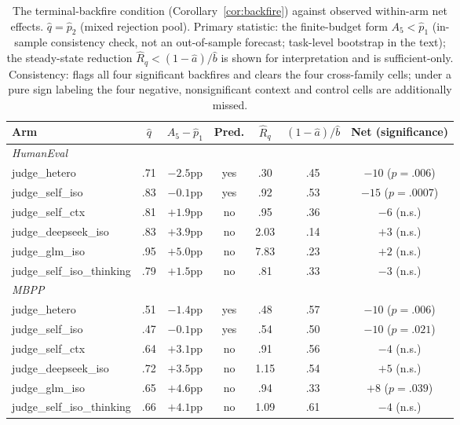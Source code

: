 \documentclass[10pt]{article}
\begin{document}
\begin{table}[t]
\centering\small
\caption{The terminal-backfire condition
(Corollary~\ref{cor:backfire}) against observed within-arm net
effects.  $\hat q = \hat p_2$ (mixed rejection pool).  Primary
statistic: the finite-budget form $A_5 < \hat p_1$ (in-sample
consistency check, not an out-of-sample forecast; task-level
bootstrap in the text); the steady-state reduction
$\hat R_q < (1-\hat a)/\hat b$ is shown
for interpretation and is sufficient-only.  Consistency: flags
all four significant backfires and clears the four cross-family
cells; under a pure sign labeling the
four negative, nonsignificant context and control cells are
additionally missed.}
\label{tab:backfire}
\begin{tabular}{lcccccc}
\toprule
Arm & $\hat q$ & $A_5 - \hat p_1$ & Pred. & $\hat R_q$ &
$(1-\hat a)/\hat b$ & Net (significance)\\
\midrule
\multicolumn{7}{l}{\emph{HumanEval}}\\
judge\_hetero & .71 & $-2.5$pp & yes & .30 & .45 & $-10$ ($p{=}.006$)\\
judge\_self\_iso & .83 & $-0.1$pp & yes & .92 & .53 & $-15$ ($p{=}.0007$)\\
judge\_self\_ctx & .81 & $+1.9$pp & no & .95 & .36 & $-6$ (n.s.)\\
judge\_deepseek\_iso & .83 & $+3.9$pp & no & 2.03 & .14 & $+3$ (n.s.)\\
judge\_glm\_iso & .95 & $+5.0$pp & no & 7.83 & .23 & $+2$ (n.s.)\\
judge\_self\_iso\_thinking & .79 & $+1.5$pp & no & .81 & .33 & $-3$ (n.s.)\\
\midrule
\multicolumn{7}{l}{\emph{MBPP}}\\
judge\_hetero & .51 & $-1.4$pp & yes & .48 & .57 & $-10$ ($p{=}.006$)\\
judge\_self\_iso & .47 & $-0.1$pp & yes & .54 & .50 & $-10$ ($p{=}.021$)\\
judge\_self\_ctx & .64 & $+3.1$pp & no & .91 & .56 & $-4$ (n.s.)\\
judge\_deepseek\_iso & .72 & $+3.5$pp & no & 1.15 & .54 & $+5$ (n.s.)\\
judge\_glm\_iso & .65 & $+4.6$pp & no & .94 & .33 & $+8$ ($p{=}.039$)\\
judge\_self\_iso\_thinking & .66 & $+4.1$pp & no & 1.09 & .61 & $-4$ (n.s.)\\
\bottomrule
\end{tabular}
\end{table}
\end{document}
